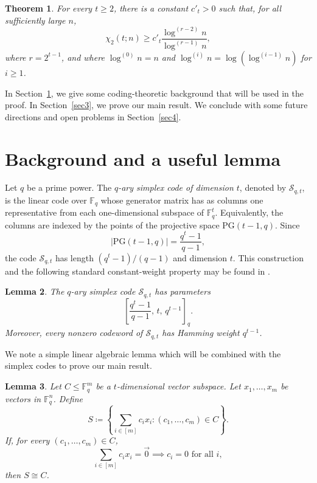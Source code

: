 \documentclass[a4paper,11pt]{amsproc}
\theoremstyle{plain}
\newtheorem{Theorem} {Theorem} [section]
\newtheorem{Lemma} [Theorem] {Lemma}
\theoremstyle{definition}
\begin{document}
\begin{Theorem}
    \label{thm:main2}
    For every $t \geq 2$, there is a constant $c'_t > 0$ such that, for all sufficiently large $n$,
    \[
        \chi_2(t; n) \geq c'_t
        \frac{\log^{(r-2)} n}{\log^{(r-1)} n},
    \]
    where $r = 2^{t - 1}$, and where $\log^{(0)} n = n$ and
    $\log^{(i)} n = \log(\log^{(i-1)} n)$ for $i \geq 1$.
\end{Theorem}

In Section~\ref{sec2}, we give some 
coding-theoretic background that will be used in the proof. 
In Section~\ref{sec3}, we prove our main result. 
We conclude with some future directions and open problems in Section~\ref{sec4}.


\section{Background and a useful lemma} \label{sec2}

Let $q$ be a prime power. The \emph{$q$-ary simplex code of dimension $t$}, denoted by $\mathcal{S}_{q,t}$, is the linear code over $\mathbb{F}_q$ whose generator matrix has as columns one representative from each one-dimensional subspace of $\mathbb{F}_q^t$. 
Equivalently, the columns are indexed by the points of the projective space $\mathrm{PG}(t-1,q)$. Since \begin{equation*} 
|\mathrm{PG}(t-1,q)|=\frac{q^t-1}{q-1}, 
\end{equation*} the code $\mathcal{S}_{q,t}$ has length $(q^t-1)/(q-1)$ and dimension $t$. 
This construction and the following standard constant-weight property
may be found in \cite[Theorem~2.7.5, p.~82]{HuffmanPless}.

\begin{Lemma} 
\label{lem:simplex}
    The $q$-ary simplex code $\mathcal{S}_{q,t}$ has parameters 
    \begin{equation*} \left[\frac{q^t-1}{q-1},\,t,\,q^{t-1}\right]_q. \end{equation*} 
    Moreover, every nonzero codeword of $\mathcal{S}_{q,t}$ has Hamming weight $q^{t-1}$. 
\end{Lemma}



We note a simple linear algebraic lemma which will be combined with the simplex codes to prove our main result. 

\begin{Lemma}\label{lem:isomorphism}
    Let $C \leq \mathbb{F}_q^m$ be a $t$-dimensional vector subspace. 
    Let $x_1, \dots, x_m$ be vectors in $\mathbb{F}_q^n$. 
    Define
    \[
        S \coloneqq \left\{\sum_{i \in [m]} c_i x_i :
        (c_1, \dots, c_m) \in C\right\}.
    \]
    If, for every $(c_1,\dots,c_m)\in C$,
    \[
        \sum_{i \in [m]} c_i x_i = \vec{0}
        \implies c_i = 0 \text{ for all } i,
    \]
    then $S \cong C$.
\end{Lemma}
\end{document}

